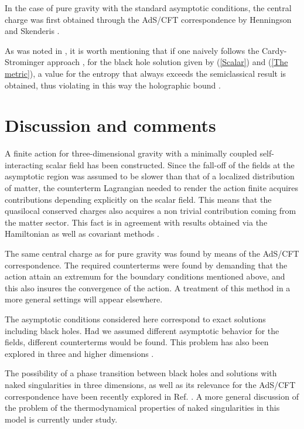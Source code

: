 \documentclass[a4paper,12pt]{article}
\begin{document}
In the case of pure gravity with the standard asymptotic conditions, the 
central charge was first obtained through the AdS/CFT correspondence by
Henningson and Skenderis \cite{Henningson:1998gx}.

As was noted in \cite{HMTZ}, it is worth mentioning that if one naively
follows the Cardy-Strominger approach \cite{Strominger:1997eq}, for the
black hole solution given by (\ref{Scalar}) and (\ref{The metric}), a value
for the entropy that always exceeds the semiclassical result is obtained,
thus violating in this way the holographic bound \cite{'tHooft:gx,Susskind:1994vu}.

\section{Discussion and comments}

A finite action for three-dimensional gravity with a minimally coupled
self-interacting scalar field has been constructed. Since the fall-off of
the fields at the asymptotic region was assumed to be slower than that of a
localized distribution of matter, the counterterm Lagrangian needed to
render the action finite acquires contributions depending explicitly on the
scalar field. This means that the quasilocal conserved charges also acquires
a non trivial contribution coming from the matter sector. This fact is in
agreement with results obtained via the Hamiltonian \cite{HMTZ} as well
as covariant methods \cite{Barnich:2002pi}.

The same central charge as for pure gravity was found by means of the
AdS/CFT correspondence. The required counterterms were found by demanding that the 
action attain an extremum for the boundary conditions mentioned above,
and this also insures the convergence of the action. A treatment of this
method in a more general settings will appear elsewhere.

The asymptotic conditions considered here correspond to exact solutions
including black holes. Had we assumed different asymptotic behavior for the
fields, different counterterms would be found. This problem has also been explored
 in three and higher dimensions \cite{Nojiri:2000kh, deHaro:2000xn, Berg:2002hy}.

The possibility of a phase transition between black holes and solutions with
naked singularities \cite{Das:2001rk} in three dimensions, as well as its
relevance for the AdS/CFT correspondence have been recently explored
 in Ref. \cite{Das:2001wu}. A more general discussion of the problem of the
thermodynamical properties of naked singularities in this model is currently
under study.
\end{document}
